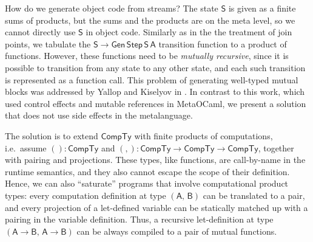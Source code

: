 \documentclass[acmsmall,screen,review,anonymous]{acmart}
\newcommand{\msf}[1]{{\mathsf{#1}}}
\newcommand{\vA}{\mathsf{A}}
\newcommand{\vB}{\mathsf{B}}
\newcommand{\vS}{\mathsf{S}}
\newcommand{\CTy}{\msf{CompTy}}
\theoremstyle{remark}
\newcommand{\Gen}{\msf{Gen}}
\newcommand{\Step}{\msf{Step}}
\begin{document}
How do we generate object code from streams? The state $\vS$ is given as a
finite sums of products, but the sums and the products are on the meta level, so
we cannot directly use $\vS$ in object code. Similarly as in the the treatment
of join points, we tabulate the $\vS \to \Gen\,\Step\,\vS\,\vA$ transition
function to a product of functions. However, these functions need to be
\emph{mutually recursive}, since it is possible to transition from any state to
any other state, and each such transition is represented as a function call.
This problem of generating well-typed mutual blocks was addressed by Yallop and
Kiselyov in \cite{DBLP:conf/pepm/YallopK19}. In contrast to this work, which
used control effects and mutable references in MetaOCaml, we present a solution
that does not use side effects in the metalanguage.

The solution is to extend $\CTy$ with finite products of computations,
i.e.\ assume $() : \CTy$ and $({,}) : \CTy \to \CTy \to \CTy$, together with
pairing and projections. These types, like functions, are call-by-name in the
runtime semantics, and they also cannot escape the scope of their definition.
Hence, we can also ``saturate'' programs that involve computational product types:
every computation definition at type $(\vA,\,\vB)$ can be translated to a pair,
and every projection of a let-defined variable can be statically matched up with
a pairing in the variable definition. Thus, a recursive let-definition at type
$(\vA \to \vB,\,\vA \to \vB)$ can be always compiled to a pair of mutual
functions.
\end{document}
